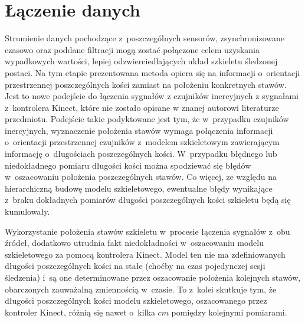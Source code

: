 \section{Łączenie danych}
										
Strumienie danych pochodzące z~poszczególnych sensorów, zsynchronizowane czasowo oraz poddane filtracji mogą zostać połączone celem uzyskania wypadkowych wartości, lepiej odzwierciedlających układ szkieletu śledzonej postaci. Na tym etapie prezentowana metoda opiera się na informacji o~orientacji przestrzennej poszczególnych kości zamiast na położeniu konkretnych stawów. Jest to nowe podejście do łączenia sygnałów z czujników inercyjnych z sygnałami z~kontrolera Kinect, które nie zostało opisane w znanej autorowi literaturze przedmiotu. Podejście takie podyktowane jest tym, że w~przypadku czujników inercyjnych, wyznaczenie położenia stawów wymaga połączenia informacji o~orientacji przestrzennej czujników z~modelem szkieletowym zawierającym informację o~długościach poszczególnych kości. W~przypadku błędnego lub niedokładnego pomiaru długości kości można spodziewać się błędów w~oszacowaniu położenia poszczególnych stawów. Co więcej, ze względu na hierarchiczną budowę modelu szkieletowego, ewentualne błędy wynikające z~braku dokładnych pomiarów długości poszczególnych kości szkieletu będą się kumulowały. 

Wykorzystanie położenia stawów szkieletu w~procesie łączenia sygnałów z~obu źródeł, dodatkowo utrudnia fakt niedokładności w~oszacowaniu modelu szkieletowego za pomocą kontrolera Kinect. Model ten nie ma zdefiniowanych długości poszczególnych kości na stałe (choćby na czas pojedynczej sesji śledzenia) i~są one determinowane przez oszacowanie położenia kolejnych stawów, obarczonych zauważalną zmiennością w~czasie. To z~kolei skutkuje tym, że długości poszczególnych kości modelu szkieletowego, oszacowanego przez kontroler Kinect, różnią się nawet o~kilka $cm$ pomiędzy kolejnymi pomiarami.
										
